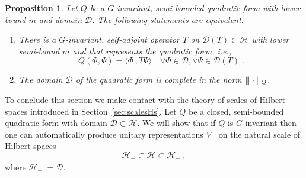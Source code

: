 \documentclass[a4paper,12pt]{amsart}
\newcommand{\scalar}[2]{\langle#1\,,#2\rangle}
\newcommand{\normm}[1]{|\negthinspace\|#1\|\negthinspace|}
\renewcommand{\H}{\mathcal{H}}
\newcommand{\D}{\mathcal{D}}
\newcommand{\1}{\mathbb{I}}
\newtheorem{proposition}[theorem]{Proposition}
\numberwithin{equation}{section}
\numberwithin{theorem}{section}
\begin{document}
\begin{proposition}\label{InvariantRepresentation}
Let $Q$ be a $G$-invariant, semi-bounded quadratic form with lower bound $m$ and domain $\D$. The following statements are equivalent:
\begin{enumerate}
\item[(i)] There is a $G$-invariant, self-adjoint operator $T$ on $\D(T)\subset\H$ with lower semi-bound $m$ and that represents the quadratic form,
i.e., $$Q(\Phi,\Psi)=\scalar{\Phi}{T\Psi}\quad\forall \Phi\in\D,\forall \Psi\in \D(T)\;.$$
\item[(ii)] The domain $\D$ of the quadratic form is complete in the norm $\normm{\cdot}_{Q}$.
\end{enumerate}
\end{proposition}


To conclude this section we make contact with the theory of scales of Hilbert spaces introduced in Section~\ref{sec:scalesHs}.
Let $Q$ be a closed, semi-bounded quadratic form with domain $\D\subset\H$. We will show that if $Q$ is $G$-invariant then one
can automatically produce unitary representations $V_\pm$ on the natural scale of Hilbert spaces
$$
 \mathcal{H}_+\subset \mathcal{H} \subset\mathcal{H}_-\;,
$$
where $\mathcal{H}_+:=\D$.
\end{document}
